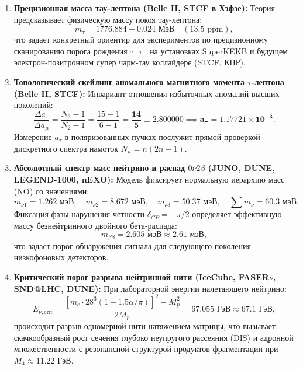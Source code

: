 \documentclass[11pt,a4paper]{article}
\theoremstyle{definition}
\theoremstyle{remark}
\begin{document}
\begin{enumerate}
    \item \textbf{Прецизионная масса тау-лептона (Belle II, STCF в Хэфэе):}
    Теория предсказывает физическую массу покоя тау-лептона:
    \begin{equation}
        m_\tau = \mathbf{1776.884 \pm 0.024\text{ МэВ}} \quad (13.5\text{ ppm}),
    \end{equation}
    что задает конкретный ориентир для экспериментов по прецизионному сканированию порога рождения $\tau^+\tau^-$ на установках SuperKEKB и будущем электрон-позитронном супер чарм-тау коллайдере (STCF, КНР).

    \item \textbf{Топологический скейлинг аномального магнитного момента $\tau$-лептона (Belle II, STCF):}
    Инвариант отношения избыточных аномалий высших поколений:
    \begin{equation}
        \frac{\Delta a_\tau}{\Delta a_\mu} = \frac{N_3 - 1}{N_2 - 1} = \frac{15 - 1}{6 - 1} = \boldsymbol{\frac{14}{5} \equiv 2.800000} \implies \mathbf{a_\tau = 1.17721 \times 10^{-3}}.
    \end{equation}
    Измерение $a_\tau$ в поляризованных пучках послужит прямой проверкой дискретного спектра намоток $N_n = n(2n-1)$.

    \item \textbf{Абсолютный спектр масс нейтрино и распад $0\nu 2\beta$ (JUNO, DUNE, LEGEND-1000, nEXO):}
    Модель фиксирует нормальную иерархию масс (NO) со значениями:
    \begin{equation}
        m_{\nu 1} = 1.262\text{ мэВ}, \quad m_{\nu 2} = 8.672\text{ мэВ}, \quad m_{\nu 3} = 50.37\text{ мэВ}, \quad \sum m_\nu = \mathbf{60.3\text{ мэВ}}.
    \end{equation}
    Фиксация фазы нарушения четности $\delta_{CP} = -\pi/2$ определяет эффективную массу безнейтринного двойного бета-распада:
    \begin{equation}
        m_{\beta\beta} = \mathbf{2.605\text{ мэВ}} \approx \mathbf{2.61\text{ мэВ}},
    \end{equation}
    что задает порог обнаружения сигнала для следующего поколения низкофоновых детекторов.

    \item \textbf{Критический порог разрыва нейтринной нити (IceCube, FASER$\nu$, SND@LHC, DUNE):}
    При лабораторной энергии налетающего нейтрино:
    \begin{equation}
        E_{\nu, \mathrm{crit}} = \frac{[m_e \cdot 28^3(1+1.5\alpha/\pi)]^2 - M_p^2}{2 M_p} = \mathbf{67.055\text{ ГэВ}} \approx \mathbf{67.1\text{ ГэВ}},
    \end{equation}
    происходит разрыв одномерной нити натяжением матрицы, что вызывает скачкообразный рост сечения глубоко неупругого рассеяния (DIS) и адронной множественности с резонансной структурой продуктов фрагментации при $M_4 \approx 11.22\text{ ГэВ}$.


\end{enumerate}
\end{document}
